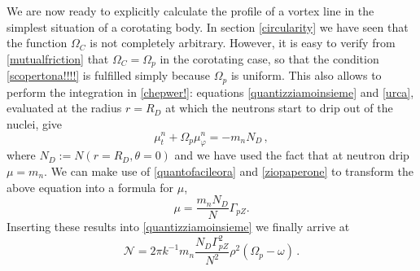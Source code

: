 \documentclass[usenatbib%
]{mnras}
\begin{document}
We are now ready to explicitly calculate the profile of a vortex line in the simplest situation of a corotating body. 
In section \ref{circularity} we have seen that the function $\Omega_C$ is not completely arbitrary. 
However, it is easy to verify from \eqref{mutualfriction} that $\Omega_C = \Omega_p$ in the corotating case, so that the condition \eqref{scopertona!!!!} is fulfilled simply because $\Omega_p$ is uniform. 
This also allows to perform the integration in \eqref{chepwer!}: equations \eqref{quantizziamoinsieme} and \eqref{urca}, evaluated at the radius $r=R_D$ at which the neutrons start to drip out of the nuclei, give
\begin{equation}
\mu_{t}^n + \Omega_p \mu_{\varphi}^n = -m_n N_D \, ,
\end{equation} 
where $N_D:= N(r=R_D,\theta=0)$ and we have used the fact that at neutron drip $\mu=m_n$. 
We can make use of \eqref{quantofacileora} and \eqref{ziopaperone} to transform the above equation into a formula for $\mu$, 
\begin{equation}\label{chemicalgrosso}
\mu =\dfrac{m_n N_D}{N} \Gamma_{pZ}.
\end{equation}
Inserting these results into \eqref{quantizziamoinsieme} we finally arrive at 
\begin{equation}\label{ottantre}
\mathcal{N} = 2\pi k^{-1} m_n \dfrac{N_D \Gamma_{pZ}^2}{N^2} \rho^2 (\Omega_p - \omega) \, .
\end{equation}
%
%
%
\end{document}
